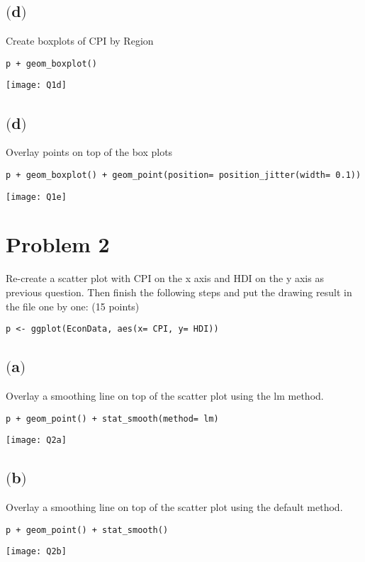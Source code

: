 \documentclass[a4paper,man,natbib]{apa6}
\begin{document}
\subsection{$($d$)$}
Create boxplots of CPI by Region \\
\begin{verbatim}
p + geom_boxplot()
\end{verbatim}
\texttt{[image: Q1d]}

\subsection{$($d$)$}
Overlay points on top of the box plots \\
\begin{verbatim}
p + geom_boxplot() + geom_point(position= position_jitter(width= 0.1))
\end{verbatim}
\texttt{[image: Q1e]}

\pagebreak
\section{Problem 2}
Re-create a scatter plot with CPI on the x axis and HDI on the y axis as previous question. Then finish the following steps and put the drawing result in the file one by one: (15 points) \\ 
\begin{verbatim}
p <- ggplot(EconData, aes(x= CPI, y= HDI))
\end{verbatim}

\subsection{$($a$)$}
Overlay a smoothing line on top of the scatter plot using the lm method. \\
\begin{verbatim}
p + geom_point() + stat_smooth(method= lm)
\end{verbatim}
\texttt{[image: Q2a]}

\subsection{$($b$)$}
Overlay a smoothing line on top of the scatter plot using the default method. \\
\begin{verbatim}
p + geom_point() + stat_smooth()
\end{verbatim}
\texttt{[image: Q2b]}
\end{document}
